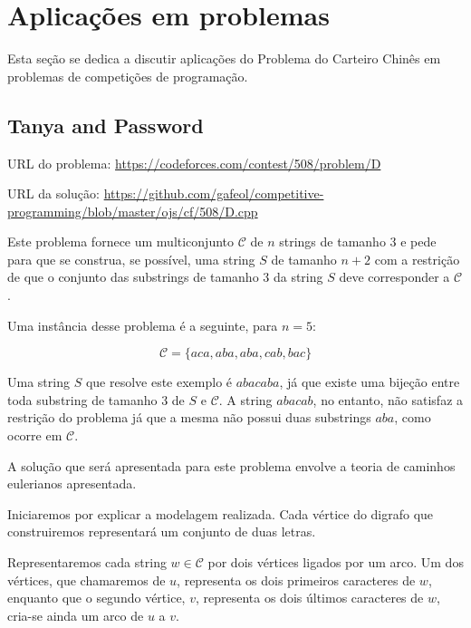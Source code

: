     \chapter{Aplicações em problemas}

        Esta seção se dedica a discutir aplicações do Problema do Carteiro Chinês em problemas de competições de programação.

        \section{Tanya and Password}

        \hspace{0.55cm}URL do problema: \href{https://codeforces.com/contest/508/problem/D}{https://codeforces.com/contest/508/problem/D}

        URL da solução: \href{https://github.com/gafeol/competitive-programming/blob/master/ojs/cf/508/D.cpp}{https://github.com/gafeol/competitive-programming\-/blob/master/ojs/cf/508/D.cpp}

        Este problema fornece um multiconjunto $\mathcal{C}$ de $n$ strings de tamanho 3 e pede para que se construa, se possível, uma string $S$ de tamanho $n+2$ com a restrição de que o conjunto das substrings de tamanho 3 da string $S$ deve corresponder a $\mathcal{C}$.

        Uma instância desse problema é a seguinte, para $n=5$:

        \[\mathcal{C} = \{aca, aba, aba, cab, bac\}\]

        Uma string $S$ que resolve este exemplo é $abacaba$, já que existe uma bijeção entre toda substring de tamanho 3 de $S$ e $\mathcal{C}$.
        A string $abacab$, no entanto, não satisfaz a restrição do problema já que a mesma não possui duas substrings $aba$, como ocorre em $\mathcal{C}$.

        A solução que será apresentada para este problema envolve a teoria de caminhos eulerianos apresentada.

        Iniciaremos por explicar a modelagem realizada. Cada vértice do digrafo que construiremos representará um conjunto de duas letras. 
        
        Representaremos cada string $w \in \mathcal{C}$ por dois vértices ligados por um arco. Um dos vértices, que chamaremos de $u$, representa os dois primeiros caracteres de $w$, enquanto que o segundo vértice, $v$, representa os dois últimos caracteres de $w$, cria-se ainda um arco de $u$ a $v$.

